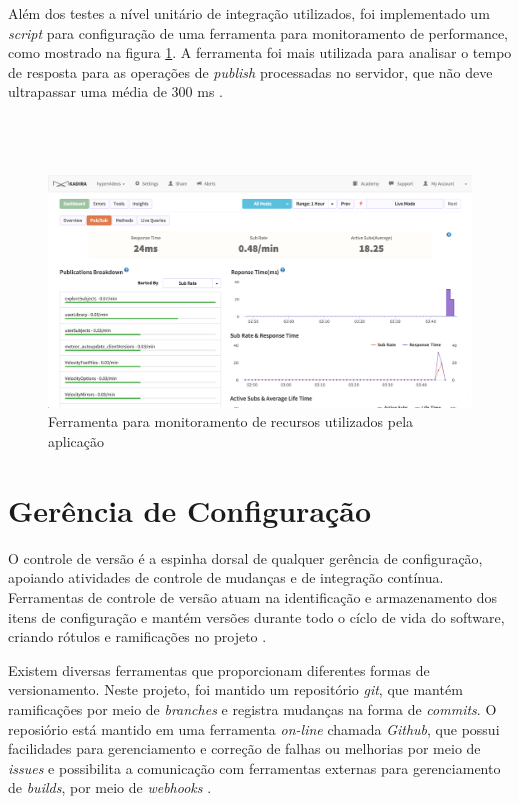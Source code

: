 Além dos testes a nível unitário de integração utilizados, foi implementado um \textit{script} para configuração de uma ferramenta  para monitoramento de performance, como mostrado na figura \ref{fig:profile}. A ferramenta foi mais utilizada para analisar o tempo de resposta para as operações de \textit{publish} processadas no servidor, que não deve ultrapassar uma média de 300 ms \cite{kadira2015}.
\\ 
\\
\\
\\
\begin{figure}[h!]
  	\centering
  	\includegraphics[width=.7\linewidth]{figuras/profile.eps}
  	\caption{Ferramenta para monitoramento de recursos utilizados pela aplicação}
  	\label{fig:profile}
\end{figure}

\section{Gerência de Configuração}

O controle de versão é a espinha dorsal de qualquer gerência de configuração, apoiando atividades de controle de mudanças e de integração contínua. Ferramentas de controle de versão atuam na identificação e armazenamento dos itens de configuração e mantém versões durante todo o cíclo de vida do software, criando rótulos e ramificações no projeto \cite{swebok2014}. 

Existem diversas ferramentas que proporcionam diferentes formas de versionamento. Neste projeto, foi mantido um repositório \textit{git}, que mantém ramificações por meio de \textit{branches} e registra mudanças na forma de \textit{commits}. O reposiório está mantido em uma ferramenta \textit{on-line} chamada \textit{Github}, que possui facilidades para gerenciamento e correção de falhas ou melhorias por meio de \textit{issues} e possibilita a comunicação com ferramentas externas para gerenciamento de \textit{builds}, por meio de \textit{webhooks} \cite{github2015}.

